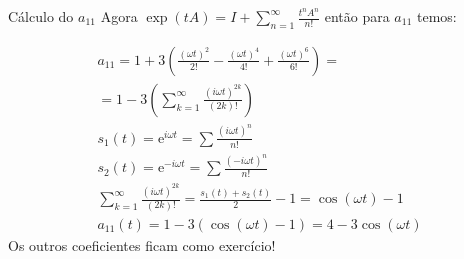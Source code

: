 \documentclass{beamer}
\begin{document}
\begin{frame}{Cálculo do $a_{11}$}
 Agora 
 $\exp(tA)=I + \sum_{n=1}^\infty \frac{t^n A^n}{n!}$ então para $a_{11}$ temos:
 
 \begin{gather*}
   a_{11} =1 + 3(\frac{(\omega t)^2}{2!} - \frac{(\omega t)^4}{4!} + \frac{(\omega t)^6}{6!}) = \\
   = 1 - 3(\sum_{k=1}^\infty \frac{(i\omega t)^{2k}}{(2k)!})\\
   s_1(t)=\text{e}^{i\omega t} = \sum \frac{(i\omega t)^n}{n!} \\
   s_2(t) =\text{e}^{-i\omega t} = \sum \frac{(-i\omega t)^n}{n!} \\
   \sum_{k=1}^\infty \frac{(i\omega t)^{2k}}{(2k)!} = \frac{s_1(t)+s_2(t)}{2} -1 = \cos(\omega t)-1\\
   a_{11}(t) = 1 -3(\cos(\omega t)-1)= 4-3\cos(\omega t)
\end{gather*}
Os outros coeficientes ficam como exercício!
\end{frame}
\end{document}
